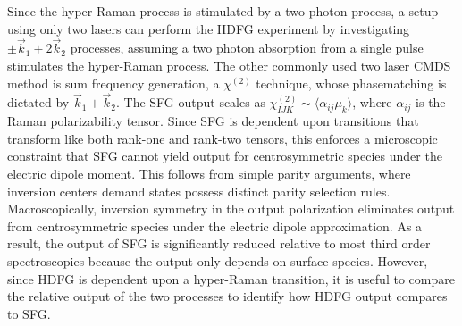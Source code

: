\documentclass[aip, jcp, reprint, onecolumn]{revtex4-2}
\begin{document}
Since the hyper-Raman process is stimulated by a two-photon process, a setup using only two lasers can perform the HDFG experiment by investigating $\pm \vec{k}_1 + 2\vec{k}_2$ processes, assuming a two photon absorption from a single pulse stimulates the hyper-Raman process.
The other commonly used two laser CMDS method is sum frequency generation, a $\chi^{(2)}$ technique, whose phasematching is dictated by $\vec{k}_1 + \vec{k}_2$.
The SFG output scales as $\chi^{(2)}_{IJK} \sim \langle \alpha_{ij} \mu_k \rangle$, where $\alpha_{ij}$ is the Raman polarizability tensor.
Since SFG is dependent upon transitions that transform like both rank-one and rank-two tensors, this enforces a microscopic constraint that SFG cannot yield output for centrosymmetric species under the electric dipole moment.
This follows from simple parity arguments, where inversion centers demand states possess distinct parity selection rules. \cite{RN230}
Macroscopically, inversion symmetry in the output polarization eliminates output from centrosymmetric species under the electric dipole approximation.
As a result, the output of SFG is significantly reduced relative to most third order spectroscopies because the output only depends on surface species.
However, since HDFG is dependent upon a hyper-Raman transition, it is useful to compare the relative output of the two processes to identify how HDFG output compares to SFG.
\end{document}
